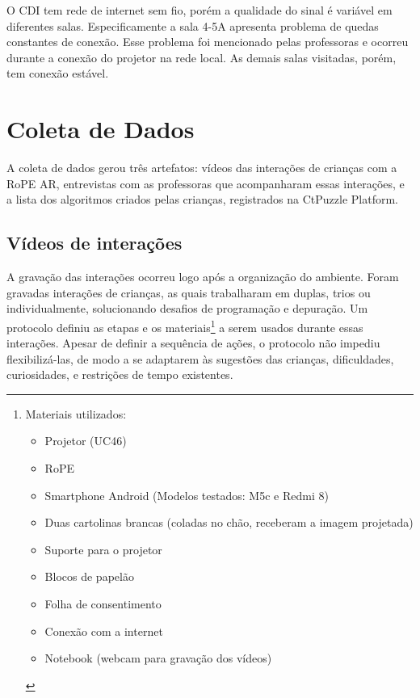O CDI tem rede de internet sem fio, porém a qualidade do sinal é variável em diferentes salas. Especificamente a sala 4-5A apresenta problema de quedas constantes de conexão. Esse problema foi mencionado pelas professoras e ocorreu durante a conexão do projetor na rede local. As demais salas visitadas, porém, tem conexão estável.

\section{Coleta de Dados}
\label{sec:protocolo}
A coleta de dados gerou três artefatos: vídeos das interações de crianças com a RoPE AR, entrevistas com as professoras que acompanharam essas interações, e a lista dos algoritmos criados pelas crianças, registrados na CtPuzzle Platform. 

\subsection{Vídeos de interações}
A gravação das interações ocorreu logo após a organização do ambiente. Foram gravadas interações de crianças, as quais trabalharam em duplas, trios ou individualmente, solucionando desafios de programação e depuração. Um protocolo definiu as etapas e os materiais\footnote{
    Materiais utilizados:
    \begin{itemize}
        \item Projetor (UC46)
        \item RoPE
        \item Smartphone Android (Modelos testados: M5c e Redmi 8)
        \item Duas cartolinas brancas (coladas no chão, receberam a imagem projetada)
        \item Suporte para o projetor
        \item Blocos de papelão
        \item Folha de consentimento
        \item Conexão com a internet
        \item Notebook (webcam para gravação dos vídeos)
    \end{itemize}
} a serem usados durante essas interações. Apesar de definir a sequência de ações, o protocolo não impediu flexibilizá-las, de modo a se adaptarem às sugestões das crianças, dificuldades, curiosidades, e restrições de tempo existentes.

